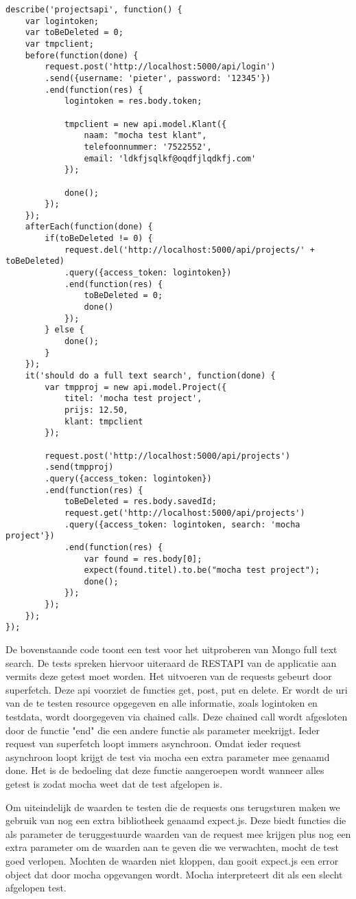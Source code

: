 \documentclass[a4paper,11pt]{article}
\begin{document}
\begin{lstlisting}
describe('projectsapi', function() {
	var logintoken;
	var toBeDeleted = 0;
	var tmpclient;
	before(function(done) {
		request.post('http://localhost:5000/api/login')
		.send({username: 'pieter', password: '12345'})
		.end(function(res) {
			logintoken = res.body.token;
			
			tmpclient = new api.model.Klant({
				naam: "mocha test klant",
				telefoonnummer: '7522552',
				email: 'ldkfjsqlkf@oqdfjlqdkfj.com'
			});
			
			done();
		});
	});
	afterEach(function(done) {
		if(toBeDeleted != 0) {
			request.del('http://localhost:5000/api/projects/' + toBeDeleted)
			.query({access_token: logintoken})
			.end(function(res) {
				toBeDeleted = 0;
				done()
			});
		} else {
			done();
		}
	});
	it('should do a full text search', function(done) {
		var tmpproj = new api.model.Project({
			titel: 'mocha test project',
			prijs: 12.50,
			klant: tmpclient
		});
		
		request.post('http://localhost:5000/api/projects')
		.send(tmpproj)
		.query({access_token: logintoken})
		.end(function(res) {
			toBeDeleted = res.body.savedId;
			request.get('http://localhost:5000/api/projects')
			.query({access_token: logintoken, search: 'mocha project'})
			.end(function(res) {
				var found = res.body[0];
				expect(found.titel).to.be("mocha test project");
				done();
			});
		});
	});	
});
\end{lstlisting}
De bovenstaande code toont een test voor het uitproberen van Mongo full text search. De tests spreken hiervoor uiteraard de RESTAPI van de applicatie aan vermits deze getest moet worden. Het uitvoeren van de requests gebeurt door superfetch. Deze api voorziet de functies get, post, put en delete. Er wordt de uri van de te testen resource opgegeven en alle informatie, zoals logintoken en testdata, wordt doorgegeven via chained calls. Deze chained call wordt afgesloten door de functie "end" die een andere functie als parameter meekrijgt. Ieder request van superfetch loopt immers asynchroon. Omdat ieder request asynchroon loopt krijgt de test via mocha een extra parameter mee genaamd done. Het is de bedoeling dat deze functie aangeroepen wordt wanneer alles getest is zodat mocha weet dat de test afgelopen is.

Om uiteindelijk de waarden te testen die de requests ons terugsturen maken we gebruik van nog een extra bibliotheek genaamd expect.js. Deze biedt functies die als parameter de teruggestuurde waarden van de request mee krijgen plus nog een extra parameter om de waarden aan te geven die we verwachten, mocht de test goed verlopen. Mochten de waarden niet kloppen, dan gooit expect.js een error object dat door mocha opgevangen wordt. Mocha interpreteert dit als een slecht afgelopen test.
\end{document}
